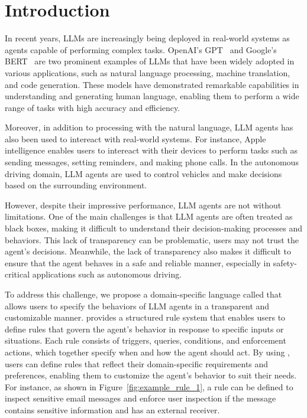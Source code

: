 
\section{Introduction} 
 
In recent years, LLMs are increasingly being deployed in real-world systems as agents capable of performing complex tasks. 
OpenAI's GPT~\cite{} and Google's BERT~\cite{} are two prominent examples of LLMs that have been widely adopted in various applications, such as natural language processing, machine translation, and code generation. These models have demonstrated remarkable capabilities in understanding and generating human language, enabling them to perform a wide range of tasks with high accuracy and efficiency.

Moreover, in addition to processing with the natural language, LLM agents has also been used to intereact with real-world systems. For instance, Apple intelligence enables users to intereact with their devices to perform tasks such as sending messages, setting reminders, and making phone calls. In the autonomous driving domain, LLM agents are used to control vehicles and make decisions based on the surrounding environment.

However, despite their impressive performance, LLM agents are not without limitations. One of the main challenges is that LLM agents are often treated as black boxes, making it difficult to understand their decision-making processes and behaviors. This lack of transparency can be problematic, users may not trust the agent's decisions. Meanwhile, the lack of transparency also makes it difficult to ensure that the agent behaves in a safe and reliable manner, especially in safety-critical applications such as autonomous driving.

To address this challenge, we propose a domain-specific language called \tool{} that allows users to specify the behaviors of LLM agents in a transparent and customizable manner. \tool{} provides a structured rule system that enables users to define rules that govern the agent's behavior in response to specific inputs or situations. Each rule consists of triggers, queries, conditions, and enforcement actions, which together specify when and how the agent should act. By using \tool{}, users can define rules that reflect their domain-specific requirements and preferences, enabling them to customize the agent's behavior to suit their needs. For instance, as shown in Figure~\ref{fig:example_rule_1}, a rule can be defined to inspect sensitive email messages and enforce user inspection if the message contains sensitive information and has an external receiver. 

